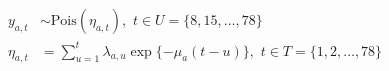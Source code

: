 \begin{align*}
  y_{a, t} &\sim \text{Pois}(\eta_{a, t}), \,\, t \in U = \{8, 15, \ldots, 78\} \\
  \eta_{a, t} &= \sum_{u = 1}^{t} \lambda_{a, u} \exp\{-\mu_{a}(t - u)\}, \,\, t \in T = \{1, 2, \ldots, 78\}
\end{align*}